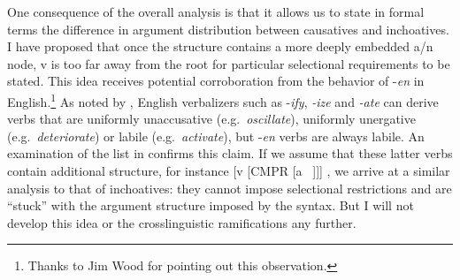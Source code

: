 \begin{exe}
\begin{xlist}
\begin{xlist}
\begin{exe}
\begin{exe}
\begin{xlist}
\begin{exe}
\begin{xlist}
\begin{exe}
\begin{xlist}
\begin{xlist}
\begin{exe}
\begin{xlist}
\begin{exe}
\begin{xlist}
\begin{exe}
\begin{exe}
\begin{exe}
\begin{xlist}
\begin{exe}
\begin{exe}
\begin{xlist}
\begin{xlist}
\begin{exe}
\begin{xlist}
\begin{exe}
\begin{exe}
\begin{exe}
\begin{xlist}
\begin{exe}
\begin{exe}
\begin{xlist}
\begin{exe}
\begin{xlist}
\begin{exe}
\begin{xlist}
\begin{exe}
\begin{xlist}
\begin{exe}
\begin{exe}
\begin{xlist}
\begin{exe}
\begin{exe}
\begin{xlist}
\begin{xlist}
\begin{exe}
\begin{xlist}
\begin{xlist}
\begin{exe}
\begin{xlist}
\begin{exe}
\begin{xlist}
\begin{exe}
\begin{xlist}
\begin{exe}
\begin{xlist}
\begin{exe}
\begin{exe}
\begin{exe}
\begin{exe}
\begin{xlist}
\begin{exe}
\begin{exe}
\begin{xlist}
\begin{xlist}
One consequence of the overall analysis is that it allows us to state in formal terms the difference in argument distribution between causatives and inchoatives. 
I have proposed that once the structure contains a more deeply embedded a/n node, v is too far away from the root for particular selectional requirements to be stated. This idea receives potential corroboration from the behavior of -\emph{en} in English.\footnote{Thanks to Jim Wood for pointing out this observation.} As noted by \cite{harley09n}, English verbalizers such as -\emph{ify}, \emph{-ize} and \emph{-ate} can derive verbs that are uniformly unaccusative (e.g.~\emph{oscillate}), uniformly unergative (e.g.~\emph{deteriorate}) or labile (e.g.~\emph{activate}), but -\emph{en} verbs are always labile. An examination of the list in \citet[245]{levin93} confirms this claim. If we assume that these latter verbs contain additional structure, for instance [v [CMPR [a ~\!]]] \citep{bobaljik12}, we arrive at a similar analysis to that of {\thif} inchoatives: they cannot impose selectional restrictions and are ``stuck'' with the argument structure imposed by the syntax. But I will not develop this idea or the crosslinguistic ramifications any further.


\end{xlist}
\end{xlist}
\end{exe}
\end{exe}
\end{xlist}
\end{exe}
\end{exe}
\end{exe}
\end{exe}
\end{xlist}
\end{exe}
\end{xlist}
\end{exe}
\end{xlist}
\end{exe}
\end{xlist}
\end{exe}
\end{xlist}
\end{xlist}
\end{exe}
\end{xlist}
\end{xlist}
\end{exe}
\end{exe}
\end{xlist}
\end{exe}
\end{exe}
\end{xlist}
\end{exe}
\end{xlist}
\end{exe}
\end{xlist}
\end{exe}
\end{xlist}
\end{exe}
\end{exe}
\end{xlist}
\end{exe}
\end{exe}
\end{exe}
\end{xlist}
\end{exe}
\end{xlist}
\end{xlist}
\end{exe}
\end{exe}
\end{xlist}
\end{exe}
\end{exe}
\end{exe}
\end{xlist}
\end{exe}
\end{xlist}
\end{exe}
\end{xlist}
\end{xlist}
\end{exe}
\end{xlist}
\end{exe}
\end{xlist}
\end{exe}
\end{exe}
\end{xlist}
\end{xlist}
\end{exe}
